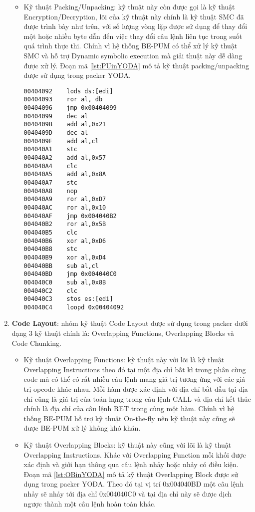 \begin{enumerate}
{\begin{itemize}
{\begin{code}
\begin{lstlisting}[captionpos=b,caption={Kỹ thuật Code Overwriting sử dụng trong packer YODA},label={lst:SMCinYODA},frame=single]
004040C3	stos es:[edi]
004040C6	mov ebp, ecx
\end{lstlisting}
\end{code}
}
\item{Kỹ thuật Packing/Unpacking: kỹ thuật này còn được gọi là kỹ thuật Encryption/Decryption, lõi của kỹ thuật này chính là kỹ thuật SMC đã được trình bày như trên, với số lượng vòng lặp được sử dụng để thay đổi một hoặc nhiều byte dẫn đến việc thay đổi câu lệnh liên tục trong suốt quá trình thực thi. Chính vì hệ thống BE-PUM có thể xử lý kỹ thuật SMC và hỗ trợ Dynamic symbolic execution mà giải thuật này dễ dàng được xử lý. Đoạn mã \ref {lst:PUinYODA} mô tả kỹ thuật packing/unpacking được sử dụng trong packer YODA.  
\begin{code}
\begin{lstlisting}[captionpos=b,caption={Kỹ thuật Packing/Unpacking sử dụng trong packer YODA},label={lst:PUinYODA},frame=single]
00404092	lods ds:[edi]
00404093	ror al, db
00404096	jmp 0x00404099
00404099	dec al
0040409B	add al,0x21
0040409D	dec al
0040409F	add al,cl
004040A1	stc
004040A2	add al,0x57
004040A4	clc
004040A5	add al,0x8A
004040A7	stc
004040A8	nop
004040A9	ror al,0xD7
004040AC	ror al,0x10
004040AF	jmp 0x004040B2
004040B2	ror al,0x5B
004040B5	clc
004040B6	xor al,0xD6
004040B8	stc
004040B9	xor al,0xD4
004040BB	sub al,cl
004040BD	jmp 0x004040C0 
004040C0	sub al,0x8B
004040C2	clc
004040C3	stos es:[edi]
004040C4	loopd 0x00404092
\end{lstlisting}
\end{code}
}
\end{itemize}
}
\item{\textbf{Code Layout}: nhóm kỹ thuật Code Layout được sử dụng trong packer dưới dạng 3 kỹ thuật chính là: Overlapping Functions, Overlapping Blocks và Code Chunking.
\begin{itemize}
\item{Kỹ thuật Overlapping Functions: kỹ thuật này với lõi là kỹ thuật Overlapping Instructions theo đó tại một địa chỉ bất kì trong phân cùng code mà có thể có rất nhiều câu lệnh mang giá trị tương ứng với các giá trị opcode khác nhau. Mỗi hàm được xác định với địa chỉ bắt đầu tại địa chỉ cũng là giá trị của toán hạng trong câu lệnh CALL và địa chỉ kết thúc chính là địa chỉ của câu lệnh RET trong cùng một hàm. Chính vì hệ thống BE-PUM hỗ trợ kỹ thuật On-the-fly nên kỹ thuật này cũng sẽ được BE-PUM xử lý không khó khăn.\\}
\item{Kỹ thuật Overlapping Blocks: kỹ thuật này cũng với lõi là kỹ thuật Overlapping Instructions. Khác với Overlapping Function mỗi khối được xác định và giới hạn thông qua câu lệnh nhảy hoặc nhảy có điều kiện. Đoạn mã \ref {lst:OBinYODA} mô tả kỹ thuật Overlapping Block được sử dụng trong packer YODA. Theo đó tại vị trí 0x004040BD một câu lệnh nhảy sẽ nhảy tới địa chỉ 0x004040C0 và tại địa chỉ này sẽ được dịch ngược thành một câu lệnh hoàn toàn khác. 
}
\end{itemize}}
\end{enumerate}
